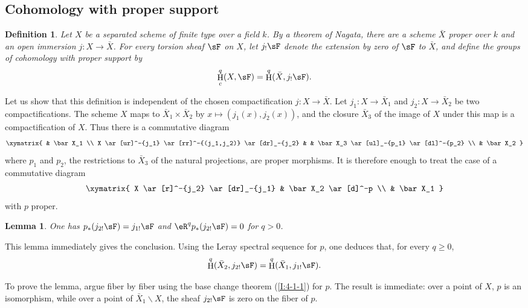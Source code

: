 \documentclass[12pt,oneside,english]{smfbook}
\DeclareMathOperator{\h}{H}
\renewcommand{\setminus}{\smallsetminus}
\newtheorem{definition}[subsubsection]{Definition}
\newtheorem{lemma}[subsubsection]{Lemma}
\begin{document}
\subsection{Cohomology with proper support}\label{I:4-5}

\begin{definition}\label{I:4-5-1}
Let $X$ be a separated scheme of finite type over a field $k$. By a theorem of Nagata, there are a scheme $\bar X$ proper over $k$ and an open immersion $j:X\to\bar X$. For every torsion sheaf $\sF$ on $X$, let $j_!\sF$ denote the extension by zero of $\sF$ to $\bar X$, and define the groups of \emph{cohomology with proper support} by
\[
  \h_c^q(X,\sF)=\h^q(\bar X, j_! \sF) \text{.}
\]
\end{definition}

Let us show that this definition is independent of the chosen compactification $j:X\to\bar X$. Let $j_1:X\to\bar X_1$ and $j_2:X\to\bar X_2$ be two compactifications. The scheme $X$ maps to $\bar X_1\times\bar X_2$ by $x\mapsto(j_1(x),j_2(x))$, and the closure $\bar X_3$ of the image of $X$ under this map is a compactification of $X$. Thus there is a commutative diagram
\[\xymatrix{
  & \bar X_1 \\
  X \ar[ur]^-{j_1} \ar[rr]^-{(j_1,j_2)} \ar[dr]_-{j_2}
    & & \bar X_3 \ar[ul]_-{p_1} \ar[dl]^-{p_2} \\
  & \bar X_2
}\]
where $p_1$ and $p_2$, the restrictions to $\bar X_3$ of the natural projections, are proper morphisms. It is therefore enough to treat the case of a commutative diagram
\[\xymatrix{
  X \ar[r]^-{j_2} \ar[dr]_-{j_1}
    & \bar X_2 \ar[d]^-p \\
  & \bar X_1
}\]
with $p$ proper.

\begin{lemma}\label{I:4-5-2}
One has $p_*(j_{2!}\sF)=j_{1!}\sF$ and $\eR^qp_*(j_{2!}\sF)=0$ for $q>0$.
\end{lemma}

This lemma immediately gives the conclusion. Using the Leray spectral sequence for $p$, one deduces that, for every $q\geqslant0$,
\[
  \h^q(\bar X_2, j_{2!} \sF) = \h^q(\bar X_1, j_{1!} \sF) \text{.}
\]

To prove the lemma, argue fiber by fiber using the base change theorem (\ref{I:4-1-1}) for $p$. The result is immediate: over a point of $X$, $p$ is an isomorphism, while over a point of $\bar X_1\setminus X$, the sheaf $j_{2!}\sF$ is zero on the fiber of $p$.

\subsubsection{}\label{I:4-5-3}
\end{document}
